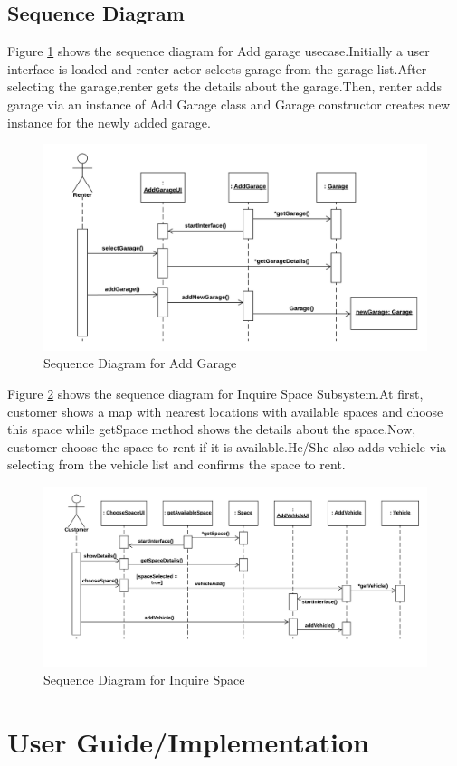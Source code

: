 \documentclass[12pt, english]{article}
\begin{document}
\subsection{Sequence Diagram}
Figure \ref{fig:seq1} shows the sequence diagram for Add garage usecase.Initially a user interface is loaded and renter actor selects garage from the garage list.After selecting the garage,renter gets the details about the garage.Then, renter adds garage via an instance of Add Garage class and Garage constructor creates new instance for the newly added garage.

\begin{figure}[h!]
                \centering
                \includegraphics[width=.6\textwidth]{seq1.png}
                \caption{Sequence Diagram for Add Garage}
                \label{fig:seq1}
\end{figure}

Figure \ref{fig:seq2} shows the sequence diagram for Inquire Space Subsystem.At first, customer shows a map with nearest locations with available spaces and choose this space while getSpace method shows the details about the space.Now, customer choose the space to rent if it is available.He/She also adds vehicle via selecting from the vehicle list and confirms the space to rent.
\begin{figure}[h!]
                \centering
                \includegraphics[width=.6\textwidth]{seq2.png}
                \caption{Sequence Diagram for Inquire Space } 
                \label{fig:seq2}
\end{figure}
\newpage

\section{User Guide/Implementation}
\end{document}
